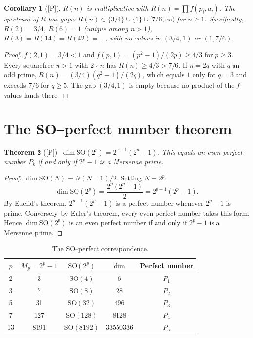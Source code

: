 \documentclass[11pt,letterpaper]{article}
\newtheorem{theorem}{Theorem}[section]
\newtheorem{corollary}[theorem]{Corollary}
\theoremstyle{definition}
\theoremstyle{remark}
\newcommand{\proven}{\textsf{[P]}}
\begin{document}
\begin{corollary}[\proven]\label{cor:R-spectrum}
$R(n)$ is multiplicative with $R(n) = \prod f(p_i,a_i)$.
The spectrum of $R$ has gaps: $R(n) \in \{3/4\} \cup \{1\} \cup [7/6, \infty)$ 
for $n \geq 1$. Specifically, $R(2) = 3/4$, $R(6) = 1$ (unique among $n>1$),
$R(3) = R(14) = R(42) = \ldots$, with no values in $(3/4, 1)$ or $(1, 7/6)$.
\end{corollary}

\begin{proof}
$f(2,1) = 3/4 < 1$ and $f(p,1) = (p^2-1)/(2p) \geq 4/3$ for $p \geq 3$.
Every squarefree $n>1$ with $2 \nmid n$ has $R(n) \geq 4/3 > 7/6$.
If $n = 2q$ with $q$ an odd prime, $R(n) = (3/4)(q^2-1)/(2q)$, which 
equals $1$ only for $q=3$ and exceeds $7/6$ for $q \geq 5$.
The gap $(3/4,1)$ is empty because no product of the $f$-values lands there.
\end{proof}

\section{The SO--perfect number theorem}
\label{sec:so-perfect}

\begin{theorem}[\proven]\label{thm:so-perfect}
$\dim\mathrm{SO}(2^p) = 2^{p-1}(2^p - 1)$.
This equals an even perfect number $P_k$ if and only if $2^p-1$ is 
a Mersenne prime.
\end{theorem}

\begin{proof}
$\dim\mathrm{SO}(N) = N(N-1)/2$. Setting $N = 2^p$:
\[
\dim\mathrm{SO}(2^p) = \frac{2^p(2^p-1)}{2} = 2^{p-1}(2^p-1).
\]
By Euclid's theorem, $2^{p-1}(2^p-1)$ is a perfect number whenever 
$2^p-1$ is prime. Conversely, by Euler's theorem, every even perfect number 
takes this form. Hence $\dim\mathrm{SO}(2^p)$ is an even perfect number 
if and only if $2^p-1$ is a Mersenne prime.
\end{proof}

\begin{table}[ht]
\centering
\caption{The SO--perfect correspondence.}
\label{tab:so-perfect}
\begin{tabular}{@{}ccccc@{}}
\toprule
$p$ & $M_p = 2^p-1$ & $\mathrm{SO}(2^p)$ & $\dim$ & Perfect number \\
\midrule
2 & 3 & $\mathrm{SO}(4)$ & 6 & $P_1$ \\
3 & 7 & $\mathrm{SO}(8)$ & 28 & $P_2$ \\
5 & 31 & $\mathrm{SO}(32)$ & 496 & $P_3$ \\
7 & 127 & $\mathrm{SO}(128)$ & 8128 & $P_4$ \\
13 & 8191 & $\mathrm{SO}(8192)$ & 33550336 & $P_5$ \\
\bottomrule
\end{tabular}
\end{table}
\end{document}
